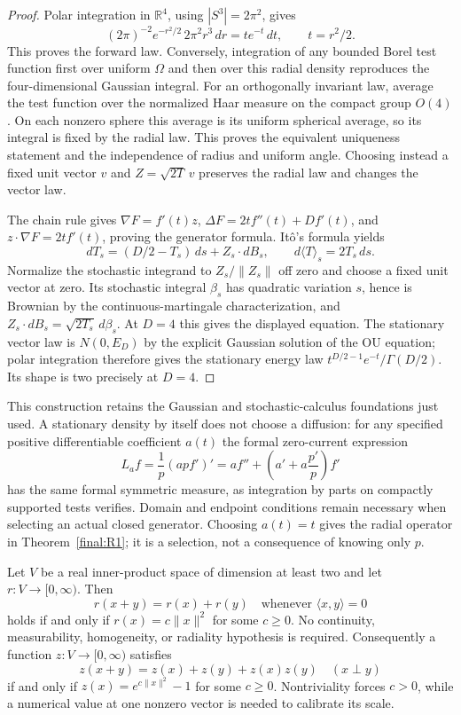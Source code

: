 \begin{proof}
Polar integration in $\mathbb R^4$, using $|S^3|=2\pi^2$, gives
\[
 (2\pi)^{-2}e^{-r^2/2}\,2\pi^2r^3\,dr
       =te^{-t}\,dt,\qquad t=r^2/2.
\]
This proves the forward law.  Conversely, integration of any bounded
Borel test function first over uniform $\Omega$ and then over this
radial density reproduces the four-dimensional Gaussian integral.
For an orthogonally invariant law, average the test function over
the normalized Haar measure on the compact group $O(4)$.  On each
nonzero sphere this average is its uniform spherical average, so
its integral is fixed by the radial law.  This proves the equivalent
uniqueness statement and the independence of radius and uniform
angle.  Choosing instead a fixed unit vector $v$ and
$Z=\sqrt{2T}\,v$ preserves the radial law and changes the vector law.

The chain rule gives
$\nabla F=f'(t)z$, $\Delta F=2tf''(t)+Df'(t)$, and
$z\cdot\nabla F=2tf'(t)$, proving the generator formula.
It\^o's formula yields
\[
 dT_s=(D/2-T_s)\,ds+Z_s\cdot dB_s,
 \qquad d\langle T\rangle_s=2T_s\,ds.
\]
Normalize the stochastic integrand to $Z_s/\|Z_s\|$ off zero and
choose a fixed unit vector at zero.  Its stochastic integral
$\beta_s$ has quadratic variation $s$, hence is Brownian by the
continuous-martingale characterization, and
$Z_s\cdot dB_s=\sqrt{2T_s}\,d\beta_s$.  At $D=4$ this gives the
displayed equation.  The stationary vector law is $N(0,E_D)$ by the
explicit Gaussian solution of the OU equation; polar integration
therefore gives the stationary energy law
$t^{D/2-1}e^{-t}/\Gamma(D/2)$.  Its shape is two precisely at $D=4$.
\end{proof}

This construction retains the Gaussian and stochastic-calculus
foundations just used.  A stationary density by itself does not
choose a diffusion: for any specified positive differentiable
coefficient $a(t)$ the formal zero-current expression
\[
 L_af=\frac1p(apf')'
     =af''+\left(a'+a\frac{p'}p\right)f'
\]
has the same formal symmetric measure, as integration by parts on
compactly supported tests verifies.  Domain and endpoint conditions
remain necessary when selecting an actual closed generator.  Choosing
$a(t)=t$ gives the radial operator in Theorem~\ref{final:R1}; it is a
selection, not a consequence of knowing only $p$.

\begin{theorem}
\label{final:R2}
Let $V$ be a real inner-product space of dimension at least two and
let $r:V\to[0,\infty)$.  Then
\[
 r(x+y)=r(x)+r(y)\quad\text{whenever }\langle x,y\rangle=0
\]
holds if and only if $r(x)=c\|x\|^2$ for some $c\geq0$.  No continuity,
measurability, homogeneity, or radiality hypothesis is required.
Consequently a function $z:V\to[0,\infty)$ satisfies
\[
 z(x+y)=z(x)+z(y)+z(x)z(y)\quad(x\perp y)
\]
if and only if $z(x)=e^{c\|x\|^2}-1$ for some $c\geq0$.
Nontriviality forces $c>0$, while a numerical value at one nonzero
vector is needed to calibrate its scale.
\end{theorem}


